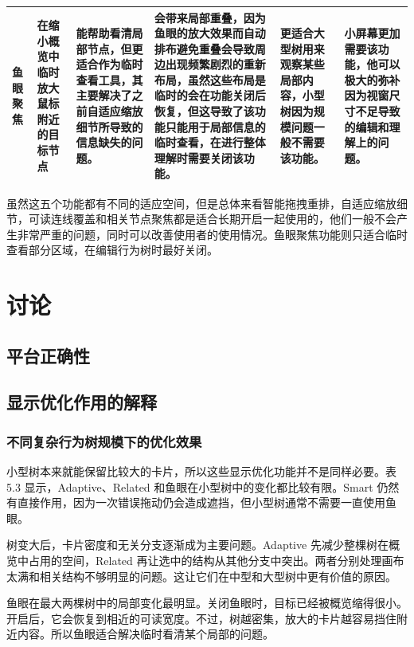 \documentclass[11pt,a4paper,oneside,extrafontsizes]{memoir}
\begin{document}
\begin{center}
\begin{longtable}{@{}p{} p{} p{} p{} p{} p{}@{}}
鱼眼聚焦 & 在缩小概览中临时放大鼠标附近的目标节点 & 能帮助看清局部节点，但更适合作为临时查看工具，其主要解决了之前自适应缩放细节所导致的信息缺失的问题。 & 会带来局部重叠，因为鱼眼的放大效果而自动排布避免重叠会导致周边出现频繁剧烈的重新布局，虽然这些布局是临时的会在功能关闭后恢复，但这导致了该功能只能用于局部信息的临时查看，在进行整体理解时需要关闭该功能。 & 更适合大型树用来观察某些局部内容，小型树因为规模问题一般不需要该功能。 & 小屏幕更加需要该功能，他可以极大的弥补因为视窗尺寸不足导致的编辑和理解上的问题。 \\
\bottomrule
\end{longtable}
\end{center}

虽然这五个功能都有不同的适应空间，但是总体来看智能拖拽重排，自适应缩放细节，可读连线覆盖和相关节点聚焦都是适合长期开启一起使用的，他们一般不会产生非常严重的问题，同时可以改善使用者的使用情况。鱼眼聚焦功能则只适合临时查看部分区域，在编辑行为树时最好关闭。

\chapter{讨论}

\section{平台正确性}

\section{显示优化作用的解释}

\subsection{不同复杂行为树规模下的优化效果}

小型树本来就能保留比较大的卡片，所以这些显示优化功能并不是同样必要。表 5.3 显示，Adaptive、Related 和鱼眼在小型树中的变化都比较有限。Smart 仍然有直接作用，因为一次错误拖动仍会造成遮挡，但小型树通常不需要一直使用鱼眼。

树变大后，卡片密度和无关分支逐渐成为主要问题。Adaptive 先减少整棵树在概览中占用的空间，Related 再让选中的结构从其他分支中突出。两者分别处理画布太满和相关结构不够明显的问题。这让它们在中型和大型树中更有价值的原因。

鱼眼在最大两棵树中的局部变化最明显。关闭鱼眼时，目标已经被概览缩得很小。开启后，它会恢复到相近的可读宽度。不过，树越密集，放大的卡片越容易挡住附近内容。所以鱼眼适合解决临时看清某个局部的问题。
\end{document}
